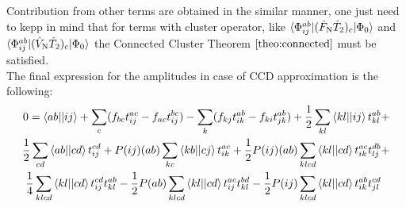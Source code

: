 \documentclass[twoside,english]{uiofysmaster}
\theoremstyle{definition}
\begin{document}
Contribution from other terms are obtained in the similar manner, one just need to kepp in mind that for terms with cluster operator, like $\braket{\Phi_{ij}^{ab}|(\hat{F}_\text{N}\hat{T}_2)_c|\Phi_0}$ and $\braket{\Phi_{ij}^{ab}|(\hat{V}_\text{N}\hat{T}_2)_c|\Phi_0}$ the Connected Cluster Theorem $\ref{theo:connected}$ must be satisfied.\\
The final expression for the amplitudes in case of CCD approximation is the following:
\begin{eqnarray}
0 =\braket{ab||ij} + \sum_{c}(f_{bc}t_{ij}^{ac}-f_{ac}t_{ij}^{bc} ) - \sum_{k}(f_{kj}t_{ik}^{ab}-f_{ki}t_{jk}^{ab} ) + \frac{1}{2} \sum_{kl}\braket{kl||ij}t_{kl}^{ab} \nonumber &+\\
 \frac{1}{2} \sum_{cd}\braket{ab||cd}t_{ij}^{cd} + P(ij)(ab)  \sum_{kc}\braket{kb||cj}t_{ik}^{ac} + 
 \frac{1}{2} P(ij)(ab) \sum_{klcd}\braket{kl||cd}t_{ik}^{ac} t_{lj}^{db} \nonumber & + \\
 \frac{1}{4} \sum_{klcd}\braket{kl||cd}t_{ij}^{cd} t_{kl}^{ab}  
- \frac{1}{2} P(ab) \sum_{klcd}\braket{kl||cd}t_{ij}^{ac} t_{kl}^{bd}- \frac{1}{2} P(ij) \sum_{klcd}\braket{kl||cd}t_{ik}^{ab} t_{jl}^{cd} &  
\end{eqnarray}
\end{document}
